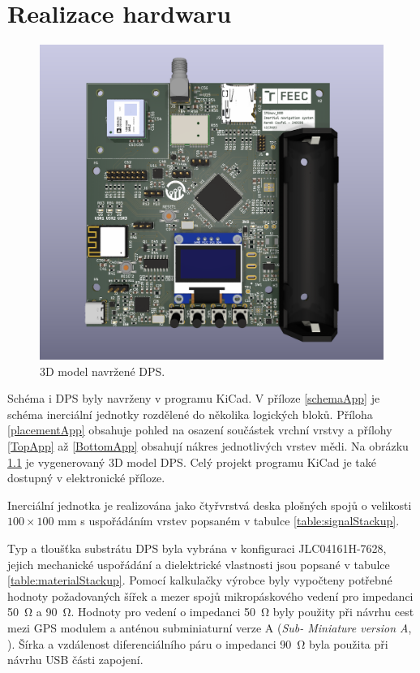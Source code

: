 \chapter{Realizace hardwaru} \label{hardware}
\begin{figure}[h]
    \centering
    \includegraphics[width=\textwidth]{KiCad/3Dboard}
    \caption{3D model navržené DPS.}
    \label{fig:3Dboard}
\end{figure}

Schéma i \ac{DPS} byly navrženy v programu KiCad. V příloze \ref{schemaApp} je schéma inerciální jednotky rozdělené do několika logických bloků. Příloha \ref{placementApp} obsahuje pohled na osazení součástek vrchní vrstvy a přílohy \ref{TopApp} až \ref{BottomApp} obsahují nákres jednotlivých vrstev mědi. Na obrázku \ref{fig:3Dboard} je vygenerovaný 3D model \ac{DPS}. Celý projekt programu KiCad je také dostupný v elektronické příloze.

Inerciální jednotka je realizována jako čtyřvrstvá deska plošných spojů o velikosti $ 100 \times 100 $ mm s uspořádáním vrstev popsaném v tabulce \ref{table:signalStackup}.


Typ a tloušťka substrátu \ac{DPS} byla vybrána v konfiguraci JLC04161H-7628, jejich mechanické uspořádání a dielektrické vlastnosti jsou popsané v tabulce \ref{table:materialStackup}. Pomocí kalkulačky výrobce byly vypočteny potřebné hodnoty požadovaných šířek a mezer spojů mikropáskového vedení pro impedanci \SI{50}{\ohm} a \SI{90}{\ohm}. Hodnoty pro vedení o impedanci \SI{50}{\ohm} byly použity při návrhu cest mezi \ac{GPS} modulem a anténou subminiaturní verze A (\emph{Sub-
Miniature version A}, ). Šírka a vzdálenost diferenciálního páru o impedanci \SI{90}{\ohm} byla použita při návrhu \ac{USB} části zapojení.


